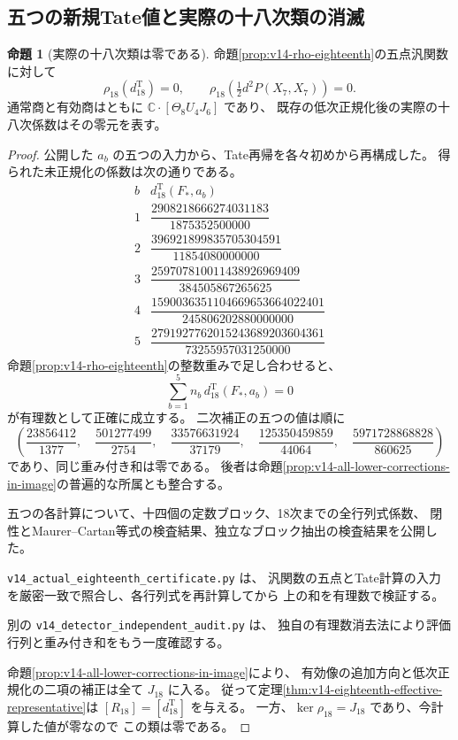 \documentclass[a4paper,11pt]{ltjsarticle}
\theoremstyle{definition}
\newtheorem{proposition}[theorem]{命題}
\newcommand{\CC}{\mathbb C}
\begin{document}
\subsection{五つの新規Tate値と実際の十八次類の消滅}

\begin{proposition}[実際の十八次類は零である]
\label{prop:v14-actual-eighteenth-class}
命題\ref{prop:v14-rho-eighteenth}の五点汎関数に対して
\[
 \rho_{18}(d^{\mathrm T}_{18})=0,\qquad
 \rho_{18}\left(\tfrac12d^2P(X_7,X_7)\right)=0.
\]
通常商と有効商はともに $\CC\cdot[\Theta_8U_4J_6]$ であり、
既存の低次正規化後の実際の十八次係数はその零元を表す。
\end{proposition}

\begin{proof}
公開した $a_b$ の五つの入力から、Tate再帰を各々初めから再構成した。
得られた未正規化の係数は次の通りである。
\[
\begin{array}{c|c}
b&d^{\mathrm T}_{18}(F_*,a_b)\\\hline
1&\dfrac{2908218666274031183}{1875352500000}\\[0.7em]
2&\dfrac{396921899835705304591}{11854080000000}\\[0.7em]
3&\dfrac{259707810011438926969409}{384505867265625}\\[0.7em]
4&\dfrac{1590036351104669653664022401}{245806202880000000}\\[0.7em]
5&\dfrac{2791927762015243689203604361}{73255957031250000}
\end{array}
\]
命題\ref{prop:v14-rho-eighteenth}の整数重みで足し合わせると、
\[
 \sum_{b=1}^5 n_b\,d^{\mathrm T}_{18}(F_*,a_b)=0
\]
が有理数として正確に成立する。
二次補正の五つの値は順に
\[
 \left(
 \frac{23856412}{1377},\quad
 \frac{501277499}{2754},\quad
 \frac{33576631924}{37179},\quad
 \frac{125350459859}{44064},\quad
 \frac{5971728868828}{860625}
 \right)
\]
であり、同じ重み付き和は零である。
後者は命題\ref{prop:v14-all-lower-corrections-in-image}の普遍的な所属とも整合する。

五つの各計算について、十四個の定数ブロック、18次までの全行列式係数、
閉性とMaurer--Cartan等式の検査結果、独立なブロック抽出の検査結果を公開した。

\texttt{v14\_actual\_eighteenth\_certificate.py} は、
汎関数の五点とTate計算の入力を厳密一致で照合し、各行列式を再計算してから
上の和を有理数で検証する。

別の \texttt{v14\_detector\_independent\_audit.py} は、
独自の有理数消去法により評価行列と重み付き和をもう一度確認する。

命題\ref{prop:v14-all-lower-corrections-in-image}により、
有効像の追加方向と低次正規化の二項の補正は全て $J_{18}$ に入る。
従って定理\ref{thm:v14-eighteenth-effective-representative}は
$[R_{18}]=[d^{\mathrm T}_{18}]$ を与える。
一方、$\ker\rho_{18}=J_{18}$ であり、今計算した値が零なので
この類は零である。
\end{proof}
\end{document}
